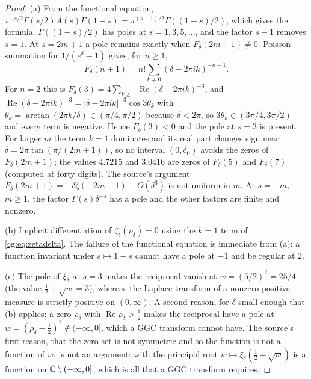 \begin{proof}
(a) From the functional equation, $\pi^{-s/2}\Gamma(s/2)A(s)\Gamma(1-s)=\pi^{(s-1)/2}\Gamma((1-s)/2)$, which gives the formula. $\Gamma((1-s)/2)$ has poles at $s=1,3,5,\dots$, and the factor $s-1$ removes $s=1$. At $s=2m+1$ a pole remains exactly when $F_\delta(2m+1)\ne0$. Poisson summation for $1/(e^\delta-1)$ gives, for $n\ge1$,
\[
F_\delta(n+1)=n!\sum_{k\ne0}(\delta-2\pi ik)^{-n-1}.
\]
For $n=2$ this is $F_\delta(3)=4\sum_{k\ge1}\operatorname{Re}(\delta-2\pi ik)^{-3}$, and $\operatorname{Re}(\delta-2\pi ik)^{-3}=|\delta-2\pi ik|^{-3}\cos3\theta_k$ with $\theta_k=\arctan(2\pi k/\delta)\in(\pi/4,\pi/2)$ because $\delta<2\pi$, so $3\theta_k\in(3\pi/4,3\pi/2)$ and every term is negative. Hence $F_\delta(3)<0$ and the pole at $s=3$ is present. For larger $m$ the term $k=1$ dominates and its real part changes sign near $\delta=2\pi\tan(\pi/(2m+1))$, so no interval $(0,\delta_0)$ avoids the zeros of $F_\delta(2m+1)$; the values $4.7215$ and $3.0416$ are zeros of $F_\delta(5)$ and $F_\delta(7)$ (computed at forty digits). The source's argument $F_\delta(2m+1)=-\delta\zeta(-2m-1)+O(\delta^3)$ is not uniform in $m$. At $s=-m$, $m\ge1$, the factor $\Gamma(s)\delta^{-s}$ has a pole and the other factors are finite and nonzero.

(b) Implicit differentiation of $\zeta_\delta(\rho_\delta)=0$ using the $k=1$ term of \eqref{cg:eq:zetadelta}. The failure of the functional equation is immediate from (a): a function invariant under $s\mapsto1-s$ cannot have a pole at $-1$ and be regular at $2$.

(c) The pole of $\xi_\delta$ at $s=3$ makes the reciprocal vanish at $w=(5/2)^2=25/4$ (the value $\frac12+\sqrt w=3$), whereas the Laplace transform of a nonzero positive measure is strictly positive on $(0,\infty)$. A second reason, for $\delta$ small enough that (b) applies: a zero $\rho_\delta$ with $\operatorname{Re}\rho_\delta>\frac12$ makes the reciprocal have a pole at $w=(\rho_\delta-\frac12)^2\notin(-\infty,0]$, which a GGC transform cannot have. The source's first reason, that the zero set is not symmetric and so the function is not a function of $w$, is not an argument: with the principal root $w\mapsto\xi_\delta(\frac12+\sqrt w)$ is a function on $\mathbb{C}\setminus(-\infty,0]$, which is all that a GGC transform requires.
\end{proof}

